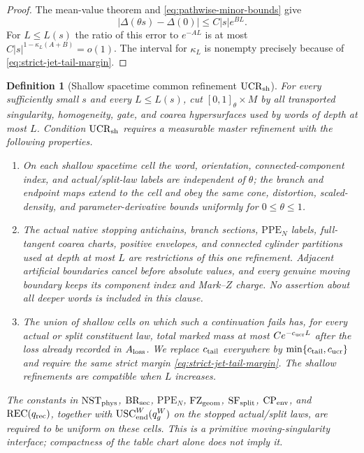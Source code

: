 \documentclass[11pt]{article}
\newtheorem{definition}[theorem]{Definition}
\begin{document}
\begin{proof}
The mean-value theorem and \eqref{eq:pathwise-minor-bounds} give
\[
 |\Delta(\theta s)-\Delta(0)|\le C|s|e^{BL}.
\]
For $L\le L(s)$ the ratio of this error to $e^{-AL}$ is at most
$C|s|^{1-\kappa_L(A+B)}=o(1)$.  The interval for $\kappa_L$ is nonempty precisely
because of \eqref{eq:strict-jet-tail-margin}.
\end{proof}

\begin{definition}[Shallow spacetime common refinement
$\mathrm{UCR}_{\rm sh}$]
\label{def:spacetime-common-refinement}
For every sufficiently small $s$ and every $L\le L(s)$, cut
$[0,1]_\theta\times M$ by all transported singularity, homogeneity, gate,
and coarea hypersurfaces used by words of depth at most $L$.  Condition
$\mathrm{UCR}_{\rm sh}$ requires a measurable master refinement with the
following properties.
\begin{enumerate}[label=\textup{(UCR\arabic*)}]
\item On each shallow spacetime cell the word, orientation,
      connected-component index, and actual/split-law labels are independent
      of $\theta$; the branch and endpoint maps extend to the cell and obey
      the same cone, distortion, scaled-density, and parameter-derivative
      bounds uniformly for $0\le\theta\le1$.
\item The actual native stopping antichains, branch sections,
      $\mathrm{PPE}_{N}$ labels, full-tangent
      coarea charts, positive envelopes, and connected cylinder partitions
      used at depth at most $L$ are restrictions of this one refinement.
      Adjacent artificial boundaries cancel before absolute values, and every
      genuine moving boundary keeps its component index and Mark--$Z$ charge.
      No assertion about all deeper words is included in this clause.
\item The union of shallow cells on which such a continuation fails has, for
      every actual or split constituent law, total marked mass at most
      $Ce^{-c_{\rm ucr}L}$ after the loss already recorded in
      $A_{\rm loss}$.  We replace $c_{\rm tail}$ everywhere by
      $\min\{c_{\rm tail},c_{\rm ucr}\}$ and require the same strict margin
      \eqref{eq:strict-jet-tail-margin}.  The shallow refinements are
      compatible when $L$ increases.
\end{enumerate}
The constants in $\mathrm{NST}_{\rm phys}$,
$\mathrm{BR}_{\rm sec}$, $\mathrm{PPE}_{N}$, $\mathrm{FZ}_{\rm geom}$,
$\mathrm{SF}_{\rm split}$, $\mathrm{CP}_{\rm env}$, and
$\mathrm{REC}(q_{\rm rec})$, together with
$\mathrm{USC}_{\rm end}^{W}(q_g^W)$ on the stopped actual/split laws, are required
to be uniform on these cells.
This is a primitive moving-singularity interface; compactness of the table
chart alone does not imply it.
\end{definition}
\end{document}
